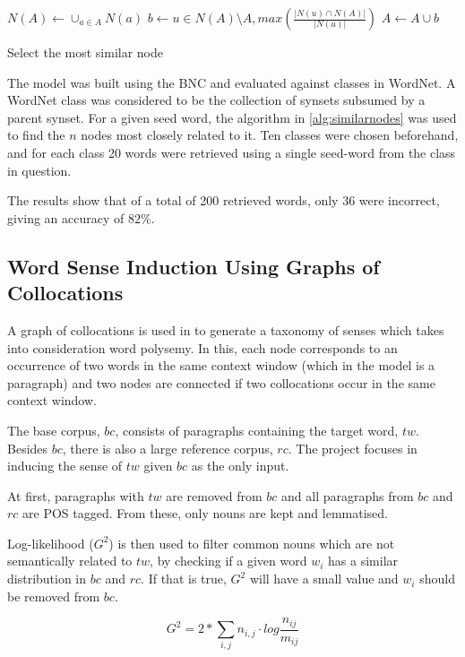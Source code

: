 \begin{algorithm}
 \begin{algorithmic}
  \State $N(A) \gets \cup_{a \in A} N(a)$
  \State $b \gets u \in N(A) \setminus A, max(\frac{|N(u) \cap N(A)|}{|N(u)|})$
  \State $A \gets A \cup b$
 \end{algorithmic}
 \caption{\label{alg:similarnodes} Select the most similar node}
\end{algorithm}

The model was built using the \ac{BNC} and evaluated against classes in
WordNet. A WordNet class was considered to be the collection of synsets
subsumed by a parent synset. For a given seed word, the algorithm in
\ref{alg:similarnodes} was used to find the $n$ nodes most closely related to
it. Ten classes were chosen beforehand, and for each class 20 words were
retrieved using a single seed-word from the class in question.

The results show that of a total of 200 retrieved words, only 36 were
incorrect, giving an accuracy of $82\%$.

\subsection{Word Sense Induction Using Graphs of Collocations}
\label{sec:collocations}

A graph of collocations is used in \cite{klapaftis2008word} to generate a
taxonomy of senses which takes into consideration word polysemy. In this, each
node corresponds to an occurrence of two words in the same context window (which
in the model is a paragraph) and two nodes are connected if two collocations
occur in the same context window.

The base corpus, $bc$, consists of paragraphs containing the target word, $tw$.
Besides $bc$, there is also a large reference corpus, $rc$. The project focuses
in inducing the sense of $tw$ given $bc$ as the only input.

At first, paragraphs with $tw$ are removed from $bc$ and all paragraphs from
$bc$ and $rc$ are \ac{POS} tagged. From these, only nouns are kept and
lemmatised.

Log-likelihood ($G^2$) is then used to filter common nouns which are not
semantically related to $tw$, by checking if a given word $w_i$ has a similar
distribution in $bc$ and $rc$. If that is true, $G^2$ will have a small value
and $w_i$ should be removed from $bc$.

\begin{equation}\label{eq:g2}
 G^2 = 2 * \sum_{i,j} n_{i,j} \cdot log \frac{n_{ij}}{m_{ij}}
\end{equation}

